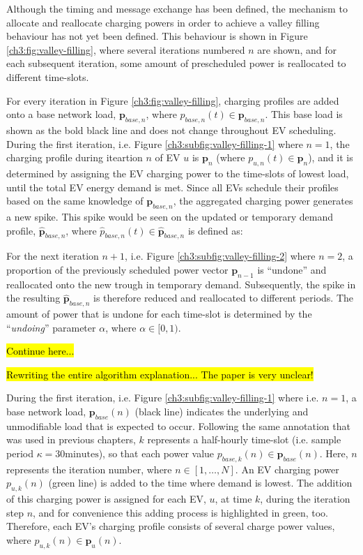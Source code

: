 Although the timing and message exchange has been defined, the mechanism to allocate and reallocate charging powers in order to achieve a valley filling behaviour has not yet been defined.
This behaviour is shown in Figure \ref{ch3:fig:valley-filling}, where several iterations numbered $n$ are shown, and for each subsequent iteration, some amount of prescheduled power is reallocated to different time-slots.



For every iteration in Figure \ref{ch3:fig:valley-filling}, charging profiles are added onto a base network load, $\textbf{p}_{base,n}$, where $p_{base,n}(t) \in \textbf{p}_{base,n}$.
This base load is shown as the bold black line and does not change throughout EV scheduling.
During the first iteration, i.e. Figure \ref{ch3:subfig:valley-filling-1} where $n=1$, the charging profile during iteartion $n$ of EV $u$ is $\textbf{p}_n$ (where $p_{u,n}(t) \in \textbf{p}_n$), and it is determined by assigning the EV charging power to the time-slots of lowest load, until the total EV energy demand is met.
Since all EVs schedule their profiles based on the same knowledge of $\textbf{p}_{base,n}$, the aggregated charging power generates a new spike.
This spike would be seen on the updated or temporary demand profile, $\hat{\textbf{p}}_{base, n}$, where $\hat{p}_{base, n}(t) \in \hat{\textbf{p}}_{base, n}$ is defined as:



For the next iteration $n+1$, i.e. Figure \ref{ch3:subfig:valley-filling-2} where $n=2$, a proportion of the previously scheduled power vector $\textbf{p}_{n-1}$ is ``undone'' and reallocated onto the new trough in temporary demand.
Subsequently, the spike in the resulting $\hat{\textbf{p}}_{base, n}$ is therefore reduced and reallocated to different periods.
The amount of power that is undone for each time-slot is determined by the ``\textit{undoing}'' parameter $\alpha$, where $\alpha \in [0, 1)$.


\hl{Continue here...}

\hl{Rewriting the entire algorithm explanation... The paper is very unclear!}

During the first iteration, i.e. Figure \ref{ch3:subfig:valley-filling-1} where i.e. $n=1$, a base network load, $\textbf{p}_{base}(n)$ (black line) indicates the underlying and unmodifiable load that is expected to occur.
Following the same annotation that was used in previous chapters, $k$ represents a half-hourly time-slot (i.e. sample period $\kappa = 30\text{minutes}$), so that each power value $p_{base,k}(n) \in \textbf{p}_{base}(n)$.
Here, $n$ represents the iteration number, where $n \in [1, \dots, N]$.
An EV charging power $p_{u,k}(n)$ (green line) is added to the time where demand is lowest.
The addition of this charging power is assigned for each EV, $u$, at time $k$, during the iteration step $n$, and for convenience this adding process is highlighted in green, too.
Therefore, each EV's charging profile consists of several charge power values, where $p_{u,k}(n) \in \textbf{p}_u(n)$.


